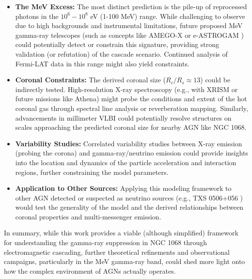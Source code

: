 \begin{itemize}
    \item \textbf{The MeV Excess:} The most distinct prediction is the pile-up of reprocessed photons in the $10^6 - 10^8$ eV (1-100 MeV) range. While challenging to observe due to high backgrounds and instrumental limitations, future proposed MeV gamma-ray telescopes (such as concepts like AMEGO-X \citep{segarro} or e-ASTROGAM \citep{astrogramillos}) could potentially detect or constrain this signature, providing strong validation (or refutation) of the cascade scenario. Continued analysis of Fermi-LAT data in this range might also yield constraints.
    \item \textbf{Coronal Constraints:} The derived coronal size ($R_c/R_s \approx 13$) could be indirectly tested. High-resolution X-ray spectroscopy (e.g., with XRISM or future missions like Athena) might probe the conditions and extent of the hot coronal gas through spectral line analysis or reverberation mapping. Similarly, advancements in millimeter VLBI could potentially resolve structures on scales approaching the predicted coronal size for nearby AGN like NGC 1068.
    \item \textbf{Variability Studies:} Correlated variability studies between X-ray emission (probing the corona) and gamma-ray/neutrino emission could provide insights into the location and dynamics of the particle acceleration and interaction regions, further constraining the model parameters.
    \item \textbf{Application to Other Sources:} Applying this modeling framework to other AGN detected or suspected as neutrino sources (e.g., TXS 0506+056 \citep{2018p}) would test the generality of the model and the derived relationships between coronal properties and multi-messenger emission.
\end{itemize}

In summary, while this work provides a viable (although simplified) framework for understanding the gamma-ray suppression in NGC 1068 through electromagnetic cascading, further theoretical refinements and observational campaigns, particularly in the MeV gamma-ray band, could shed more light onto how the complex environment of AGNs actually operates.

